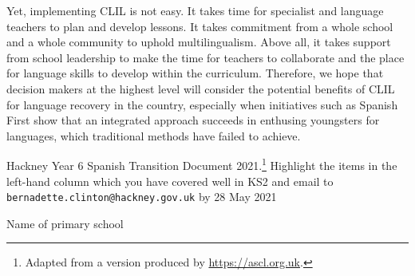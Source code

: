 \documentclass[output=paper]{langscibook}
\begin{document}
Yet, implementing CLIL is not easy. It takes time for specialist and language teachers to plan and develop lessons. It takes commitment from a whole school and a whole community to uphold multilingualism. Above all, it takes support from school leadership to make the time for teachers to collaborate and the place for language skills to develop within the curriculum. Therefore, we hope that decision makers at the highest level will consider the potential benefits of CLIL for language recovery in the country, especially when initiatives such as Spanish First show that an integrated approach succeeds in enthusing youngsters for languages, which traditional methods have failed to achieve.


\label{app:labeau:a}
Hackney Year 6 Spanish Transition Document 2021.\footnote{Adapted from a version produced by \url{https://ascl.org.uk}.} Highlight the items in the left-hand column which you have covered well in KS2 and email to
\texttt{bernadette.clinton@hackney.gov.uk} by 28 May 2021

\bigskip
\noindent
Name of primary school \hrulefill
\end{document}
